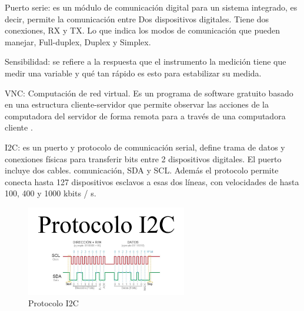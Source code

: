 Puerto serie: es un módulo de comunicación digital para
un sistema integrado, es decir, permite la comunicación entre
Dos dispositivos digitales. Tiene dos conexiones, RX y
TX. Lo que indica los modos de comunicación que pueden
manejar, Full-duplex, Duplex y Simplex.

Sensibilidad: se refiere a la respuesta que el instrumento
la medición tiene que medir una variable y qué tan rápido es
esto para estabilizar su medida. 

VNC: Computación de red virtual. Es un programa de software gratuito basado en una estructura cliente-servidor que permite
observar las acciones de la computadora del servidor de forma remota para a través de una computadora cliente \cite{velasquez2013monitoreo}.

I2C: es un puerto y protocolo de comunicación serial, define
trama de datos y conexiones físicas para transferir bits
entre 2 dispositivos digitales. El puerto incluye dos cables.
comunicación, SDA y SCL. Además el protocolo permite
conecta hasta 127 dispositivos esclavos a esas dos líneas,
con velocidades de hasta 100, 400 y 1000 kbits / s.
\begin{figure}[htbp]
\centering
\includegraphics[width=7cm]{Figuras/I2C}
\caption{Protocolo I2C}
\label{fig:I2C}
\end{figure}



